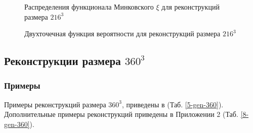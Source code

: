 			\begin{figure}[h]
				\begin{minipage}[h]{0.49\linewidth}
				\end{minipage}
				\hfill
				\begin{minipage}[h]{0.49\linewidth}
				\end{minipage}
				\caption{Распределения функционала Минковского $\xi$ для реконструкций размера $216^3$}
				\label{5-dist-Xi-216}
			\end{figure}
		
			\begin{figure}[h]
				\begin{minipage}[h]{0.49\linewidth}
				\end{minipage}
				\hfill
				\begin{minipage}[h]{0.49\linewidth}
				\end{minipage}
				\caption{Двухточечная функция вероятности для реконструкций размера $216^3$}
				\label{5-prob-216}
			\end{figure}

	\subsection{Реконструкции размера $360^3$}
		\subsubsection{Примеры}
			Примеры реконструкций размера $360^3$, приведены в (Таб. \ref{5-gen-360}). Дополнительные примеры реконструкций приведены в Приложении 2 (Таб. \ref{8-gen-360}).
			
